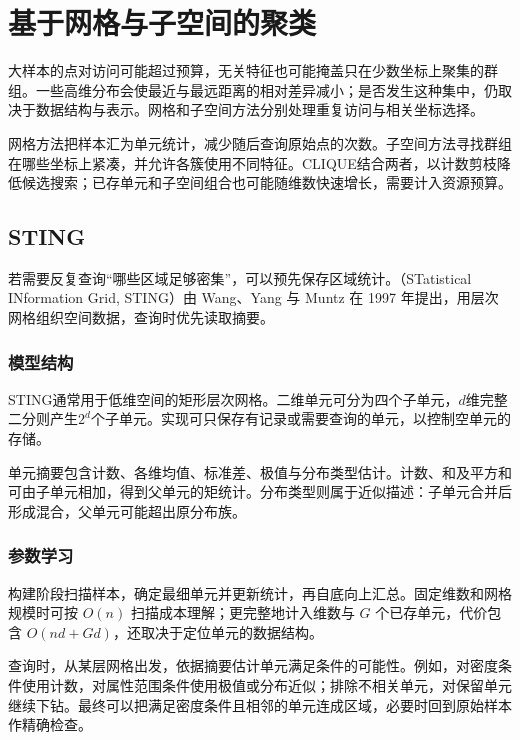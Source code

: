 \section{基于网格与子空间的聚类}
\label{sec:clustering-subspace}

大样本的点对访问可能超过预算，无关特征也可能掩盖只在少数坐标上聚集的群组。一些高维分布会使最近与最远距离的相对差异减小；是否发生这种集中，仍取决于数据结构与表示。网格和子空间方法分别处理重复访问与相关坐标选择。

网格方法把样本汇为单元统计，减少随后查询原始点的次数。子空间方法寻找群组在哪些坐标上紧凑，并允许各簇使用不同特征。CLIQUE结合两者，以计数剪枝降低候选搜索；已存单元和子空间组合也可能随维数快速增长，需要计入资源预算。

\subsection{STING}

若需要反复查询“哪些区域足够密集”，可以预先保存区域统计。（STatistical INformation Grid, STING）由 Wang、Yang 与 Muntz 在 1997 年提出，用层次网格组织空间数据，查询时优先读取摘要。

\subsubsection{模型结构}

STING通常用于低维空间的矩形层次网格。二维单元可分为四个子单元，$d$维完整二分则产生$2^d$个子单元。实现可只保存有记录或需要查询的单元，以控制空单元的存储。

单元摘要包含计数、各维均值、标准差、极值与分布类型估计。计数、和及平方和可由子单元相加，得到父单元的矩统计。分布类型则属于近似描述：子单元合并后形成混合，父单元可能超出原分布族。

\subsubsection{参数学习}

构建阶段扫描样本，确定最细单元并更新统计，再自底向上汇总。固定维数和网格规模时可按 $O(n)$ 扫描成本理解；更完整地计入维数与 $G$ 个已存单元，代价包含 $O(nd+Gd)$，还取决于定位单元的数据结构。

查询时，从某层网格出发，依据摘要估计单元满足条件的可能性。例如，对密度条件使用计数，对属性范围条件使用极值或分布近似；排除不相关单元，对保留单元继续下钻。最终可以把满足密度条件且相邻的单元连成区域，必要时回到原始样本作精确检查。

